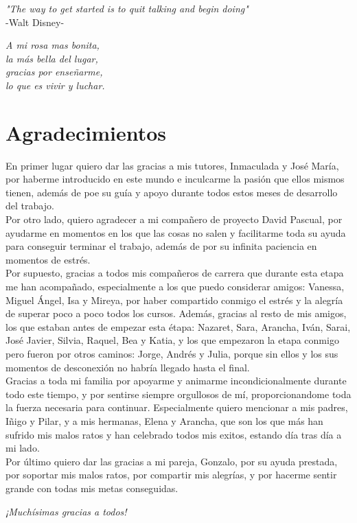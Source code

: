 {
	\vspace*{1cm}
	\begin{flushright}
		\textit{"The way to get started is to quit talking and begin doing"}\\
		\vspace{10pt}
		-Walt Disney-
	\end{flushright}
	
	\vspace*{14cm}
	\begin{flushright}
		\textit{A mi rosa mas bonita,\\
		la más bella del lugar,\\
		gracias por enseñarme,\\
		lo que es vivir y luchar.}
	\end{flushright}
}

\chapter*{Agradecimientos}

En primer lugar quiero dar las gracias a mis tutores, Inmaculada y José María, por haberme introducido en este mundo e inculcarme la pasión que ellos mismos tienen, además de poe su guía y apoyo durante todos estos meses de desarrollo del trabajo.\\
 
Por otro lado, quiero agradecer a mi compañero de proyecto David Pascual, por ayudarme en momentos en los que las cosas no salen y facilitarme toda su ayuda para conseguir terminar el trabajo, además de por su infinita paciencia en momentos de estrés.\\

Por supuesto, gracias a todos mis compañeros de carrera que durante esta etapa me han acompañado, especialmente a los que puedo considerar amigos: Vanessa, Miguel Ángel, Isa y Mireya, por haber compartido conmigo el estrés y la alegría de superar poco a poco todos los cursos. Además, gracias al resto de mis amigos, los que estaban antes de empezar esta étapa: Nazaret, Sara, Arancha, Iván, Sarai, José Javier, Silvia, Raquel, Bea y Katia, y los que empezaron la etapa conmigo pero fueron por otros caminos: Jorge, Andrés y Julia, porque sin ellos y los sus momentos de desconexión no habría llegado hasta el final.\\

Gracias a toda mi familia por apoyarme y animarme incondicionalmente durante todo este tiempo, y por sentirse siempre orgullosos de mí, proporcionandome toda la fuerza necesaria para continuar. Especialmente quiero mencionar a mis padres, Iñigo y Pilar, y a mis hermanas, Elena y Arancha, que son los que más han sufrido mis malos ratos y han celebrado todos mis exitos, estando día tras día a mi lado.\\

Por último quiero dar las gracias a mi pareja, Gonzalo, por su ayuda prestada, por soportar mis malos ratos, por compartir mis alegrías, y por hacerme sentir grande con todas mis metas conseguidas.\\

\begin{flushright}
	\emph{¡Muchí­simas gracias a todos!}
\end{flushright}